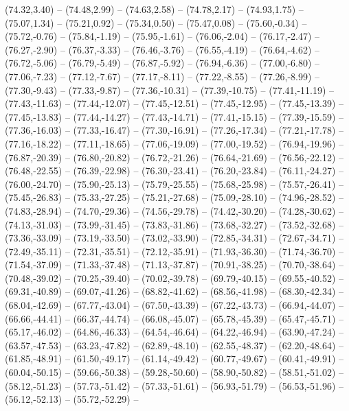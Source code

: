 {  (74.32,3.40) -- (74.48,2.99) -- (74.63,2.58) -- (74.78,2.17) -- (74.93,1.75) -- (75.07,1.34) -- (75.21,0.92) --
  (75.34,0.50) -- (75.47,0.08) -- (75.60,-0.34) -- (75.72,-0.76) -- (75.84,-1.19) -- (75.95,-1.61) -- (76.06,-2.04) --
  (76.17,-2.47) -- (76.27,-2.90) -- (76.37,-3.33) -- (76.46,-3.76) -- (76.55,-4.19) -- (76.64,-4.62) -- (76.72,-5.06) --
  (76.79,-5.49) -- (76.87,-5.92) -- (76.94,-6.36) -- (77.00,-6.80) -- (77.06,-7.23) -- (77.12,-7.67) -- (77.17,-8.11) --
  (77.22,-8.55) -- (77.26,-8.99) -- (77.30,-9.43) -- (77.33,-9.87) -- (77.36,-10.31) -- (77.39,-10.75) -- (77.41,-11.19) --
  (77.43,-11.63) -- (77.44,-12.07) -- (77.45,-12.51) -- (77.45,-12.95) -- (77.45,-13.39) -- (77.45,-13.83) -- (77.44,-14.27) --
  (77.43,-14.71) -- (77.41,-15.15) -- (77.39,-15.59) -- (77.36,-16.03) -- (77.33,-16.47) -- (77.30,-16.91) -- (77.26,-17.34) --
  (77.21,-17.78) -- (77.16,-18.22) -- (77.11,-18.65) -- (77.06,-19.09) -- (77.00,-19.52) -- (76.94,-19.96) -- (76.87,-20.39) --
  (76.80,-20.82) -- (76.72,-21.26) -- (76.64,-21.69) -- (76.56,-22.12) -- (76.48,-22.55) -- (76.39,-22.98) -- (76.30,-23.41) --
  (76.20,-23.84) -- (76.11,-24.27) -- (76.00,-24.70) -- (75.90,-25.13) -- (75.79,-25.55) -- (75.68,-25.98) -- (75.57,-26.41) --
  (75.45,-26.83) -- (75.33,-27.25) -- (75.21,-27.68) -- (75.09,-28.10) -- (74.96,-28.52) -- (74.83,-28.94) -- (74.70,-29.36) --
  (74.56,-29.78) -- (74.42,-30.20) -- (74.28,-30.62) -- (74.13,-31.03) -- (73.99,-31.45) -- (73.83,-31.86) -- (73.68,-32.27) --
  (73.52,-32.68) -- (73.36,-33.09) -- (73.19,-33.50) -- (73.02,-33.90) -- (72.85,-34.31) -- (72.67,-34.71) -- (72.49,-35.11) --
  (72.31,-35.51) -- (72.12,-35.91) -- (71.93,-36.30) -- (71.74,-36.70) -- (71.54,-37.09) -- (71.33,-37.48) -- (71.13,-37.87) --
  (70.91,-38.25) -- (70.70,-38.64) -- (70.48,-39.02) -- (70.25,-39.40) -- (70.02,-39.78) -- (69.79,-40.15) -- (69.55,-40.52) --
  (69.31,-40.89) -- (69.07,-41.26) -- (68.82,-41.62) -- (68.56,-41.98) -- (68.30,-42.34) -- (68.04,-42.69) -- (67.77,-43.04) --
  (67.50,-43.39) -- (67.22,-43.73) -- (66.94,-44.07) -- (66.66,-44.41) -- (66.37,-44.74) -- (66.08,-45.07) -- (65.78,-45.39) --
  (65.47,-45.71) -- (65.17,-46.02) -- (64.86,-46.33) -- (64.54,-46.64) -- (64.22,-46.94) -- (63.90,-47.24) -- (63.57,-47.53) --
  (63.23,-47.82) -- (62.89,-48.10) -- (62.55,-48.37) -- (62.20,-48.64) -- (61.85,-48.91) -- (61.50,-49.17) -- (61.14,-49.42) --
  (60.77,-49.67) -- (60.41,-49.91) -- (60.04,-50.15) -- (59.66,-50.38) -- (59.28,-50.60) -- (58.90,-50.82) -- (58.51,-51.02) --
  (58.12,-51.23) -- (57.73,-51.42) -- (57.33,-51.61) -- (56.93,-51.79) -- (56.53,-51.96) -- (56.12,-52.13) -- (55.72,-52.29) --
}
